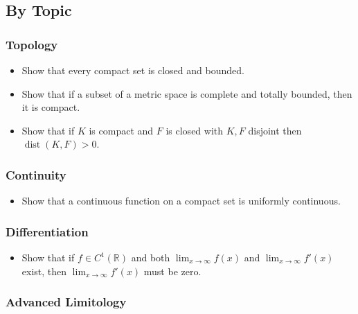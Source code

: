 \hypertarget{by-topic}{%
\subsection{By Topic}\label{by-topic}}

\hypertarget{topology}{%
\subsubsection{Topology}\label{topology}}

\begin{itemize}
\tightlist
\item
  Show that every compact set is closed and bounded.
\item
  Show that if a subset of a metric space is complete and totally
  bounded, then it is compact.
\item
  Show that if \(K\) is compact and \(F\) is closed with \(K, F\)
  disjoint then \(\operatorname{dist}(K, F) > 0\).
\end{itemize}

\hypertarget{continuity}{%
\subsubsection{Continuity}\label{continuity}}

\begin{itemize}
\tightlist
\item
  Show that a continuous function on a compact set is uniformly
  continuous.
\end{itemize}

\hypertarget{differentiation}{%
\subsubsection{Differentiation}\label{differentiation}}

\begin{itemize}
\tightlist
\item
  Show that if \(f\in C^1({\mathbb{R}})\) and both
  \(\lim_{x\to \infty} f(x)\) and \(\lim_{x\to \infty} f'(x)\) exist,
  then \(\lim_{x\to\infty} f'(x)\) must be zero.
\end{itemize}

\hypertarget{advanced-limitology}{%
\subsubsection{Advanced Limitology}\label{advanced-limitology}}

